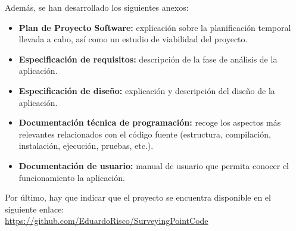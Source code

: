 Además, se han desarrollado los siguientes anexos:

\begin{itemize}
	\item \textbf {Plan de Proyecto Software:} explicación sobre la planificación temporal llevada a cabo, así como un estudio de viabilidad del proyecto.
	\item \textbf {Especificación de requisitos:} descripción de la fase de análisis de la aplicación.
	\item \textbf {Especificación de diseño:} explicación y descripción del diseño de la aplicación.
	\item \textbf {Documentación técnica de programación:} recoge los aspectos más relevantes relacionados con el código fuente (estructura, compilación, instalación, ejecución, pruebas, etc.).
	\item \textbf {Documentación de usuario:} manual de usuario que permita conocer el funcionamiento la aplicación.
\end{itemize}

Por último, hay que indicar que el proyecto se encuentra disponible en el siguiente enlace:\\
 \url{https://github.com/EduardoRisco/SurveyingPointCode}
 
 
 
 